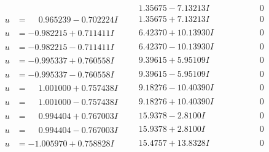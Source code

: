 \documentclass[1p]{elsarticle_modified}
\theoremstyle{definition}
\begin{document}
$$\begin{array}{c|c|c}
 & \phantom{-}1.35675 - 7.13213 I & \phantom{-0.000000 } 0 \\ \hline\begin{aligned}
u &= \phantom{-}0.965239 - 0.702224 I\end{aligned}
 & \phantom{-}1.35675 + 7.13213 I & \phantom{-0.000000 } 0 \\ \hline\begin{aligned}
u &= -0.982215 + 0.711411 I\end{aligned}
 & \phantom{-}6.42370 + 10.13930 I & \phantom{-0.000000 } 0 \\ \hline\begin{aligned}
u &= -0.982215 - 0.711411 I\end{aligned}
 & \phantom{-}6.42370 - 10.13930 I & \phantom{-0.000000 } 0 \\ \hline\begin{aligned}
u &= -0.995337 + 0.760558 I\end{aligned}
 & \phantom{-}9.39615 + 5.95109 I & \phantom{-0.000000 } 0 \\ \hline\begin{aligned}
u &= -0.995337 - 0.760558 I\end{aligned}
 & \phantom{-}9.39615 - 5.95109 I & \phantom{-0.000000 } 0 \\ \hline\begin{aligned}
u &= \phantom{-}1.001000 + 0.757438 I\end{aligned}
 & \phantom{-}9.18276 - 10.40390 I & \phantom{-0.000000 } 0 \\ \hline\begin{aligned}
u &= \phantom{-}1.001000 - 0.757438 I\end{aligned}
 & \phantom{-}9.18276 + 10.40390 I & \phantom{-0.000000 } 0 \\ \hline\begin{aligned}
u &= \phantom{-}0.994404 + 0.767003 I\end{aligned}
 & \phantom{-}15.9378 - 2.8100 I & \phantom{-0.000000 } 0 \\ \hline\begin{aligned}
u &= \phantom{-}0.994404 - 0.767003 I\end{aligned}
 & \phantom{-}15.9378 + 2.8100 I & \phantom{-0.000000 } 0 \\ \hline\begin{aligned}
u &= -1.005970 + 0.758828 I\end{aligned}
 & \phantom{-}15.4757 + 13.8328 I & \phantom{-0.000000 } 0 \\ \hline\begin{aligned}

\end{aligned}
\end{array}$$
\end{document}
